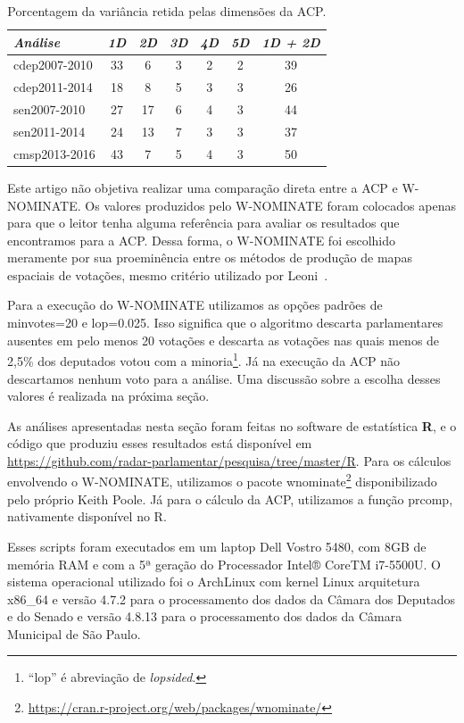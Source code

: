\documentclass[a4paper, 12pt]{article}
\newcommand\wnominate{W-NOMINATE\xspace}
\begin{document}
\begin{table}
\centering
\begin{tabular}{l c c c c c | c}
\itshape Análise & \itshape 1D & \itshape 2D & \itshape 3D & \itshape 4D & \itshape 5D & \itshape 1D + 2D \\
\hline
cdep2007-2010 & 33 &  6 & 3 & 2 & 2 & 39  \\ 
cdep2011-2014 & 18 &  8 & 5 & 3 & 3 & 26  \\ 
sen2007-2010  & 27 & 17 & 6 & 4 & 3 & 44  \\ 
sen2011-2014  & 24 & 13 & 7 & 3 & 3 & 37  \\ 
cmsp2013-2016 & 43 &  7 & 5 & 4 & 3 & 50  \\ 
\end{tabular} 
\caption{Porcentagem da variância retida pelas dimensões da ACP.}
\label{tab:variacao-explicada-acp}
\end{table}

Este artigo não objetiva realizar uma comparação direta entre a ACP e \wnominate. Os valores produzidos pelo \wnominate foram colocados apenas para que o leitor tenha alguma referência para avaliar os resultados que encontramos para a ACP. Dessa forma, o \wnominate foi escolhido meramente por sua proeminência entre os métodos de produção de mapas espaciais de votações, mesmo critério utilizado por Leoni~\cite{leoni02cdep}.

Para a execução do \wnominate utilizamos as opções padrões de \textsf{minvotes=20} e \textsf{lop=0.025}. Isso significa que o algoritmo descarta parlamentares ausentes em pelo menos 20 votações e descarta as votações nas quais menos de 2,5\% dos deputados votou com a minoria\footnote{``lop'' é abreviação de \emph{lopsided}.}. Já na execução da ACP não descartamos nenhum voto para a análise. Uma discussão sobre a escolha desses valores é realizada na próxima seção.

As análises apresentadas nesta seção foram feitas no software de estatística \textbf{R}, e o código que produziu esses resultados está disponível em \url{https://github.com/radar-parlamentar/pesquisa/tree/master/R}. Para os cálculos envolvendo o \wnominate, utilizamos o pacote \textsf{wnominate}\footnote{\url{https://cran.r-project.org/web/packages/wnominate/}} disponibilizado pelo próprio Keith Poole. Já para o cálculo da ACP, utilizamos a função \textsf{prcomp}, nativamente disponível no R.

Esses scripts foram executados em um laptop Dell Vostro 5480, com 8GB de memória RAM e com a 5ª geração do Processador Intel® CoreTM i7-5500U. O sistema operacional utilizado foi o ArchLinux com kernel Linux arquitetura x86\_64 e versão 4.7.2 para o processamento dos dados da Câmara dos Deputados e do Senado e versão 4.8.13 para o processamento dos dados da Câmara Municipal de São Paulo. 
\end{document}
